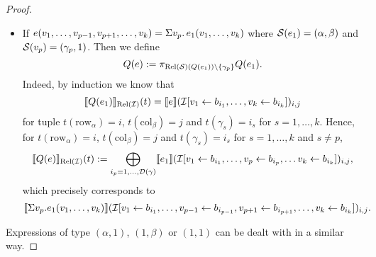 \begin{proof}
\begin{itemize}
  \item If $e(v_1,\ldots,v_{p-1},v_{p+1},\ldots,v_k)=\Sigma v_p. \, e_1(v_1,\ldots,v_k)$ where $\mathcal{S}(e_1)=(\alpha,\beta)$ and $\mathcal{S}(v_p)=(\gamma_p,1)$. Then we define
  $$
  Q (e):=\pi_{\text{Rel}(\mathcal{S})(Q(e_1))\setminus\{\gamma_p\}} Q (e_1).
  $$
 Indeed, by induction we know that 
 $$
\llbracket Q(e_1) \rrbracket_{\text{Rel}(\mathcal{I})}(t)=\llbracket e \rrbracket(\mathcal{I}[v_1\gets b_{i_1},\ldots,v_k\gets b_{i_k}])_{i,j}
$$
for tuple $t(\mathrm{row}_\alpha)=i$, $t(\mathrm{col}_\beta)=j$ and $t(\gamma_s)=i_s$ for $s=1,\ldots, k$.
Hence, for $t(\mathrm{row}_\alpha)=i$, $t(\mathrm{col}_\beta)=j$ and $t(\gamma_s)=i_s$ for $s=1,\ldots, k$ and $s\neq p$,
$$
\llbracket Q(e) \rrbracket_{\text{Rel}(\mathcal{I})}(t):=\bigoplus_{i_p=1,\ldots,\mathcal{D}(\gamma)} \llbracket e_1 \rrbracket(\mathcal{I}[v_1\gets b_{i_1},\ldots,v_{p}\gets b_{i_p},\ldots v_k\gets b_{i_k}])_{i,j},$$
which precisely corresponds to 
$$
\llbracket \Sigma v_p. e_1(v_1,\ldots,v_k) \rrbracket(\mathcal{I}[v_1\gets b_{i_1},\ldots,v_{p-1}\gets b_{i_{p-1}},v_{p+1}\gets b_{i_{p+1}},\ldots,v_k\gets b_{i_k}])_{i,j}.
$$

\end{itemize}
Expressions of type $(\alpha,1)$, $(1,\beta)$ or $(1,1)$  can be dealt with in a similar way.
\end{proof}
